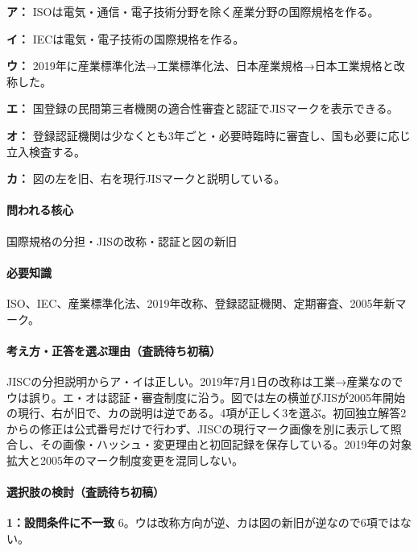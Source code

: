 \noindent\textbf{ア：} ISOは電気・通信・電子技術分野を除く産業分野の国際規格を作る。\par

\noindent\textbf{イ：} IECは電気・電子技術の国際規格を作る。\par

\noindent\textbf{ウ：} 2019年に産業標準化法→工業標準化法、日本産業規格→日本工業規格と改称した。\par

\noindent\textbf{エ：} 国登録の民間第三者機関の適合性審査と認証でJISマークを表示できる。\par

\noindent\textbf{オ：} 登録認証機関は少なくとも3年ごと・必要時臨時に審査し、国も必要に応じ立入検査する。\par

\noindent\textbf{カ：} 図の左を旧、右を現行JISマークと説明している。\par

\paragraph{問われる核心} 国際規格の分担・JISの改称・認証と図の新旧

\paragraph{必要知識} ISO、IEC、産業標準化法、2019年改称、登録認証機関、定期審査、2005年新マーク。

\paragraph{考え方・正答を選ぶ理由（査読待ち初稿）} JISCの分担説明からア・イは正しい。2019年7月1日の改称は工業→産業なのでウは誤り。エ・オは認証・審査制度に沿う。図では左の横並びJISが2005年開始の現行、右が旧で、カの説明は逆である。4項が正しく3を選ぶ。初回独立解答2からの修正は公式番号だけで行わず、JISCの現行マーク画像を別に表示して照合し、その画像・ハッシュ・変更理由と初回記録を保存している。2019年の対象拡大と2005年のマーク制度変更を混同しない。

\paragraph{選択肢の検討（査読待ち初稿）}\mbox{}\par

\noindent\textbf{1：設問条件に不一致} 6。ウは改称方向が逆、カは図の新旧が逆なので6項ではない。\par

